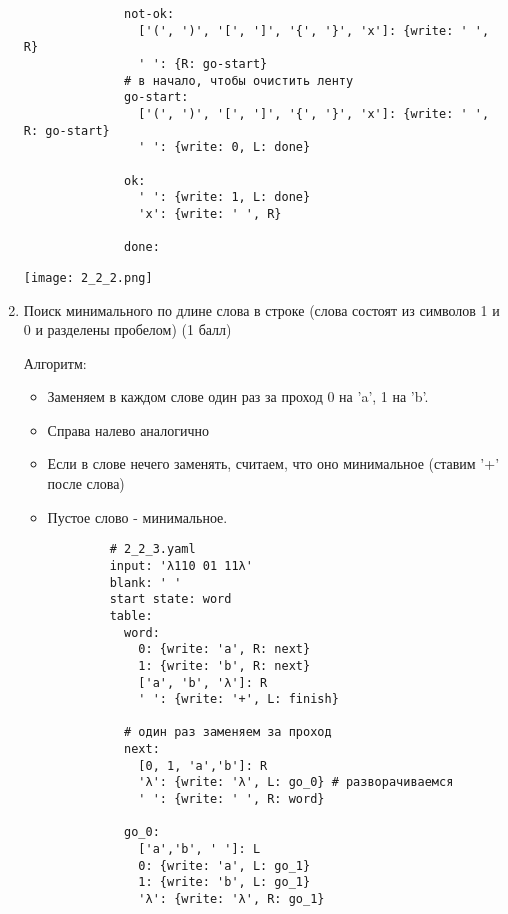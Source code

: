 \documentclass{article}
\begin{document}
\begin{enumerate}
\begin{verbatim}
              not-ok:
                ['(', ')', '[', ']', '{', '}', 'x']: {write: ' ', R}
                ' ': {R: go-start}
              # в начало, чтобы очистить ленту
              go-start:
                ['(', ')', '[', ']', '{', '}', 'x']: {write: ' ', R: go-start}
                ' ': {write: 0, L: done}
                
              ok:
                ' ': {write: 1, L: done}
                'x': {write: ' ', R}
            
              done:

        \end{verbatim}
        \begin{center}
            \texttt{[image: 2\_2\_2.png]} \\
        \end{center}

    \item Поиск минимального по длине слова в строке (слова состоят из символов 1 и 0 и разделены пробелом) (1 балл)
    
        Алгоритм:
        \begin{itemize}
            \item Заменяем в каждом слове один раз за проход 0 на 'a', 1 на 'b'.
            \item Справа налево аналогично
            \item Если в слове нечего заменять, считаем, что оно минимальное (ставим '+' после слова)
            \item Пустое слово - минимальное.
        \end{itemize}
        
        \begin{verbatim}
            # 2_2_3.yaml
            input: 'λ110 01 11λ'
            blank: ' '
            start state: word
            table:
              word:
                0: {write: 'a', R: next}
                1: {write: 'b', R: next}
                ['a', 'b', 'λ']: R
                ' ': {write: '+', L: finish}
                
              # один раз заменяем за проход
              next:
                [0, 1, 'a','b']: R
                'λ': {write: 'λ', L: go_0} # разворачиваемся
                ' ': {write: ' ', R: word}
                  
              go_0:
                ['a','b', ' ']: L
                0: {write: 'a', L: go_1}
                1: {write: 'b', L: go_1}
                'λ': {write: 'λ', R: go_1}
              

\end{verbatim}
\end{enumerate}
\end{document}

